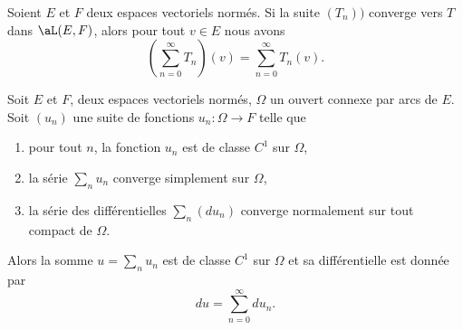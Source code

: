 \begin{lemma}
    Soient \( E\) et \( F\) deux espaces vectoriels normés. Si la suite \( (T_n))\) converge vers \( T\) dans \( \aL(E,F)\), alors pour tout \( v\in E\) nous avons
    \begin{equation}
        \left( \sum_{n=0}^{\infty}T_n \right)(v)=\sum_{n=0}^{\infty}T_n(v).
    \end{equation}
\end{lemma}

\begin{theorem} \label{ThoLDpRmXQ}
    Soit \( E\) et \( F\), deux espaces vectoriels normés, \( \Omega\) un ouvert connexe par arcs de \( E\). Soit \( (u_n)\) une suite de fonctions \( u_n\colon \Omega\to F\) telle que
    \begin{enumerate}
        \item
            pour tout \( n\), la fonction \( u_n\) est de classe \( C^1\) sur \( \Omega\),
        \item
            la série \( \sum_nu_n\) converge simplement sur \( \Omega\),
        \item
            la série des différentielles \( \sum_n(du_n)\) converge normalement sur tout compact de \( \Omega\).
    \end{enumerate}
    Alors la somme \( u=\sum_nu_n\) est de classe \( C^1\) sur \( \Omega\) et sa différentielle est donnée par
    \begin{equation}
        du=\sum_{n=0}^{\infty}du_n.
    \end{equation}
\end{theorem}

